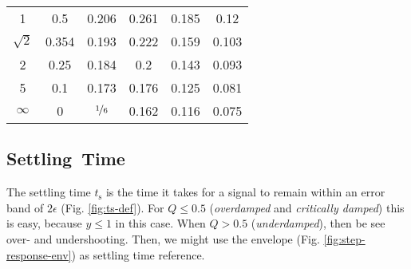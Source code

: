 \documentclass{article}[11pt]
\begin{document}
\begin{table}[H]
\begin{tabular}{cccccc}
1                        & 0.5                       & 0.206                            & 0.261                                                                  & 0.185                                                                  & 0.12                                                                   \\ 
$\sqrt{2}$               & 0.354                     & 0.193                            & 0.222                                                                  & 0.159                                                                  & 0.103                                                                  \\ 
2                        & 0.25                      & 0.184                            & 0.2                                                                    & 0.143                                                                  & 0.093                                                                  \\ 
5                        & 0.1                       & 0.173                            & 0.176                                                                  & 0.125                                                                  & 0.081                                                                  \\ 
$\infty$                 & 0                         & $\nicefrac{1}{6}$                & 0.162                                                                  & 0.116                                                                  & 0.075                                                                  \\ \toprule
\end{tabular}
\label{tab:char-td-tr}
\end{table}

\subsection{Settling~Time}

The settling time $t_{\mathrm{s}}$ is the time it takes for a signal
to remain within an error band of $2\epsilon$ (Fig. \ref{fig:ts-def}).
For $Q\leq0.5$ (\textit{overdamped} and \textit{critically damped}) 
this is easy, because $y \leq 1$ in this case.
When $Q > 0.5$  (\textit{underdamped}), then be see over- and undershooting. 
Then, we might use the envelope (Fig. \ref{fig:step-response-env})
as settling time reference.
\end{document}
